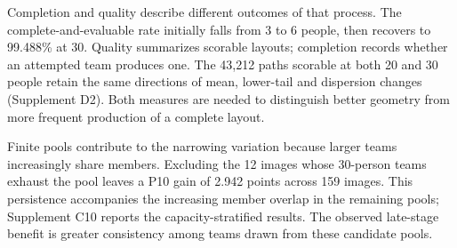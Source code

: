 Completion and quality describe different outcomes of that process. The complete-and-evaluable rate initially falls from 3 to 6 people, then recovers to 99.488\% at 30. Quality summarizes scorable layouts; completion records whether an attempted team produces one. The 43,212 paths scorable at both 20 and 30 people retain the same directions of mean, lower-tail and dispersion changes (Supplement D2). Both measures are needed to distinguish better geometry from more frequent production of a complete layout.

Finite pools contribute to the narrowing variation because larger teams increasingly share members. Excluding the 12 images whose 30-person teams exhaust the pool leaves a P10 gain of 2.942 points across 159 images. This persistence accompanies the increasing member overlap in the remaining pools; Supplement C10 reports the capacity-stratified results. The observed late-stage benefit is greater consistency among teams drawn from these candidate pools.
